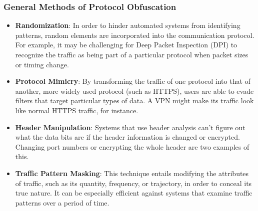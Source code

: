 \documentclass[12pt, fleqn, a4paper]{article}
\begin{document}
\subsubsection{General Methods of Protocol Obfuscation}
\begin{itemize}
  \item \textbf{Randomization}: In order to hinder automated systems from identifying patterns, random elements are incorporated into the communication protocol. For example, it may be challenging for Deep Packet Inspection (DPI) to recognize the traffic as being part of a particular protocol when packet sizes or timing change. \citep{randomization}
  \item \textbf{Protocol Mimicry}: By transforming the traffic of one protocol into that of another, more widely used protocol (such as HTTPS), users are able to evade filters that target particular types of data. A VPN might make its traffic look like normal HTTPS traffic, for instance. \citep{mimicry}
  \item \textbf{Header Manipulation}: Systems that use header analysis can't figure out what the data bits are if the header information is changed or encrypted. Changing port numbers or encrypting the whole header are two examples of this. \citep{headers}
  \item \textbf{Traffic Pattern Masking}: This technique entails modifying the attributes of traffic, such as its quantity, frequency, or trajectory, in order to conceal its true nature. It can be especially efficient against systems that examine traffic patterns over a period of time. \citep{masking}
\end{itemize}
\end{document}
